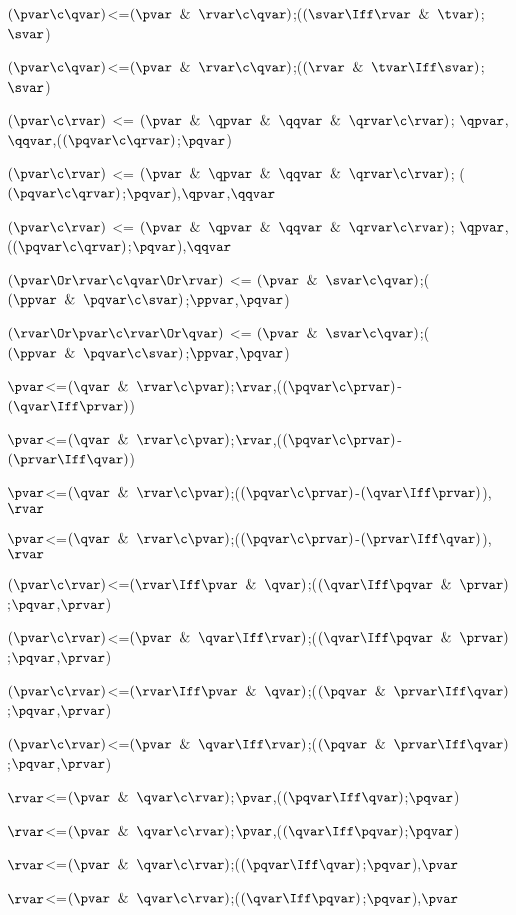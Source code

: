 $(\pvar \c \qvar)$<=$(\pvar \And \rvar \c \qvar)$;($(\svar \Iff  \rvar \And \tvar)$;$\svar$)

$(\pvar \c \qvar)$<=$(\pvar \And \rvar \c \qvar)$;($(\rvar \And \tvar\Iff \svar)$;$\svar$)

$(\pvar \c \rvar)$ <= $(\pvar \And \qpvar \And \qqvar\And \qrvar \c \rvar)$; $\qpvar$,$\qqvar$,($(\pqvar \c \qrvar)$;$\pqvar$)

$(\pvar \c \rvar)$ <= $(\pvar \And \qpvar \And \qqvar\And \qrvar \c \rvar)$; ($(\pqvar \c \qrvar)$;$\pqvar$),$\qpvar$,$\qqvar$

$(\pvar \c \rvar)$ <= $(\pvar \And \qpvar \And \qqvar\And \qrvar \c \rvar)$; $\qpvar$,($(\pqvar \c \qrvar)$;$\pqvar$),$\qqvar$

$(\pvar \Or \rvar\c \qvar \Or \rvar)$ <= $(\pvar \And \svar \c \qvar)$;($(\ppvar \And \pqvar \c \svar)$;$\ppvar$,$\pqvar$)

$(\rvar \Or \pvar\c \rvar \Or \qvar)$ <= $(\pvar \And \svar \c \qvar)$;($(\ppvar \And \pqvar \c \svar)$;$\ppvar$,$\pqvar$)

$\pvar$<=$(\qvar \And \rvar \c \pvar)$;$\rvar$,($(\pqvar \c \prvar)$-$(\qvar \Iff \prvar)$)

$\pvar$<=$(\qvar \And \rvar \c \pvar)$;$\rvar$,($(\pqvar \c \prvar)$-$(\prvar \Iff \qvar)$)

$\pvar$<=$(\qvar \And \rvar \c \pvar)$;($(\pqvar \c \prvar)$-$(\qvar \Iff \prvar)$),$\rvar$

$\pvar$<=$(\qvar \And \rvar \c \pvar)$;($(\pqvar \c \prvar)$-$(\prvar \Iff \qvar)$),$\rvar$

$(\pvar \c \rvar)$<=$(\rvar \Iff \pvar\And \qvar)$;($(\qvar \Iff \pqvar \And \prvar)$;$\pqvar$,$\prvar$)

$(\pvar \c \rvar)$<=$(\pvar\And \qvar\Iff \rvar)$;($(\qvar \Iff \pqvar \And \prvar)$;$\pqvar$,$\prvar$)

$(\pvar \c \rvar)$<=$(\rvar \Iff \pvar\And \qvar)$;($(\pqvar \And \prvar\Iff \qvar)$;$\pqvar$,$\prvar$)

$(\pvar \c \rvar)$<=$(\pvar\And \qvar\Iff \rvar)$;($(\pqvar \And \prvar\Iff \qvar)$;$\pqvar$,$\prvar$)

$\rvar$<=$(\pvar \And \qvar \c \rvar)$;$\pvar$,($(\pqvar \Iff \qvar)$;$\pqvar$)

$\rvar$<=$(\pvar \And \qvar \c \rvar)$;$\pvar$,($(\qvar \Iff \pqvar)$;$\pqvar$)

$\rvar$<=$(\pvar \And \qvar \c \rvar)$;($(\pqvar \Iff \qvar)$;$\pqvar$),$\pvar$

$\rvar$<=$(\pvar \And \qvar \c \rvar)$;($(\qvar \Iff \pqvar)$;$\pqvar$),$\pvar$

